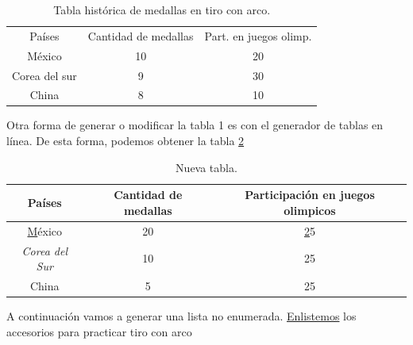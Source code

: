 \documentclass[12pt, legalpaper, twocolumn]{article}
\begin{document}
\begin{table}[H]
    \centering
    \begin{tabular}{c|c|c}
      Países   &  Cantidad de medallas & Part. en juegos olimp.\\
      México   &            10         & 20\\
      Corea del sur &       9          &  30\\
      China         &       8          & 10
    \end{tabular}
    \caption{Tabla histórica de medallas en tiro con arco.}
    \label{tab1}
\end{table}

Otra forma de generar o modificar la tabla 1 es con el generador de tablas en línea. De esta forma, podemos obtener la tabla \ref{tab2}


\begin{table}[H]
\begin{tabular}{|c|c|c|}
\hline
\rowcolor[HTML]{67FD9A} 
{\color[HTML]{333333} \textbf{Países}} & {\color[HTML]{333333} \textbf{Cantidad de medallas}} & {\color[HTML]{333333} \textbf{Participación en juegos olimpicos}} \\ \hline
\rowcolor[HTML]{FFFFFF} 
{\color[HTML]{333333} {\ul México}}           & {\color[HTML]{333333} 20} & {\color[HTML]{333333} {\ul 25}} \\ \hline
\rowcolor[HTML]{FFFFFF} 
{\color[HTML]{333333} \textit{Corea del Sur}} & {\color[HTML]{333333} 10} & {\color[HTML]{333333} 25}       \\ \hline
\rowcolor[HTML]{FFFFFF} 
China                                         & 5                         & 25                              \\ \hline
\end{tabular}
\caption{Nueva tabla.}
\label{tab2}
\end{table}



A continuación vamos a generar una lista no enumerada. \underline{Enlistemos} los accesorios para practicar tiro con arco
\end{document}
